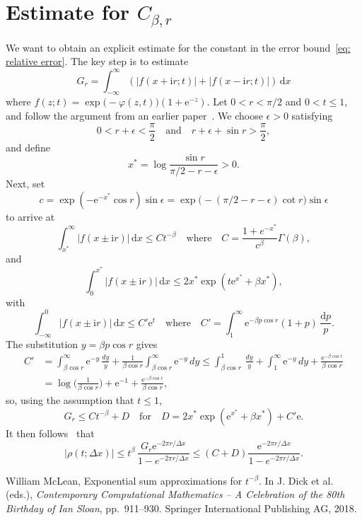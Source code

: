 \documentclass[a4paper,12pt]{article}
\newcommand{\ud}{\mathrm{d}}
\newcommand{\ue}{\mathrm{e}}
\newcommand{\ui}{\mathrm{i}}
\begin{document}
\appendix\section{Estimate for $C_{\beta,r}$}
We want to obtain an explicit estimate for the constant in the error
bound~\eqref{eq: relative error}.  The key step is to estimate
\[
G_r=\int_{-\infty}^\infty(|f(x+\ui r;t)|+|f(x-\ui r;t)|)\,\ud x
\]
where $f(z;t)=\exp\bigl(-\varphi(z,t)\bigr)(1+\ue^{-z})$.  Let $0<r<\pi/2$ and
$0<t\le 1$, and follow the argument from an earlier
paper~\cite[Lemma~1]{McLean2018}.  We choose $\epsilon>0$ satisfying
\[
0<r+\epsilon<\frac{\pi}{2}
\quad\text{and}\quad
r+\epsilon+\sin r>\frac{\pi}{2},
\]
and define
\[
x^*=\log\frac{\sin r}{\pi/2-r-\epsilon}>0.
\]
Next, set
\[
c=\exp(-\ue^{-x^*}\cos r)\sin\epsilon
    =\exp\bigl(-(\pi/2-r-\epsilon)\cot r\bigr)\sin\epsilon
\]
to arrive at
\[
\int_{x^*}^\infty|f(x\pm\ui r)|\,\ud x\le Ct^{-\beta}
\quad\text{where}\quad
C=\frac{1+e^{-x^*}}{c^\beta}\Gamma(\beta),
\]
and
\[
\int_0^{x^*}|f(x\pm\ui r)|\,\ud x
    \le2x^*\exp(t\ue^{x^*}+\beta x^*),
\]
with
\[
\int_{-\infty}^0|f(x\pm\ui r)|\,\ud x\le C'\ue^t
\quad\text{where}\quad
C'=\int_1^\infty \ue^{-\beta p\cos r}(1+p)\,\frac{\ud p}{p}.
\]
The substitution $y=\beta p\cos r$ gives
\begin{align*}
C'&=\int_{\beta\cos r}^\infty\ue^{-y}\,\frac{dy}{y}
    +\frac{1}{\beta\cos r}\int_{\beta\cos r}^\infty\ue^{-y}\,dy
    \le\int_{\beta\cos r}^1\,\frac{dy}{y}+\int_1^\infty\ue^{-y}\,dy
        +\frac{\ue^{-\beta\cos r}}{\beta\cos r}\\
    &=\log\biggl(\frac{1}{\beta\cos r}\biggr)+\ue^{-1}
        +\frac{\ue^{-\beta\cos r}}{\beta\cos r},
\end{align*}
so, using the assumption that $t\le1$,
\[
G_r\le Ct^{-\beta}+D\quad\text{for}\quad D=2x^*\exp(\ue^{x^*}+\beta x^*)+C'\ue.
\]
It then follows~\cite[Theorem~3]{McLean2018} that
\[
|\rho(t;\Delta x)|
    \le t^\beta\,\frac{G_r\ue^{-2\pi r/\Delta x}}{1-e^{-2\pi r/\Delta x}}
    \le(C+D)\frac{\ue^{-2\pi r/\Delta x}}{1-e^{-2\pi r/\Delta x}}.
\]


\begin{thebibliography}{0}
 William McLean, Exponential sum approximations for
$t^{-\beta}$.  In J. Dick et al. (eds.), \emph{ Contemporary Computational
Mathematics – A Celebration of the 80th Birthday of Ian Sloan}, pp.~911--930.
Springer International Publishing AG, 2018.
\end{thebibliography}

\end{document}
